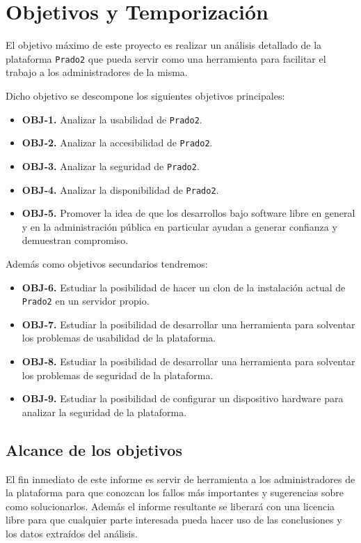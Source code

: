 \chapter{Objetivos y Temporización}


El objetivo máximo de este proyecto es realizar un análisis detallado de la plataforma \texttt{Prado2} que pueda servir como una herramienta para facilitar el trabajo a los administradores de la misma.

\bigskip
Dicho objetivo se descompone los siguientes objetivos principales:

\begin{itemize}
  \item \textbf{OBJ-1.} Analizar la usabilidad de \texttt{Prado2}.
  \item \textbf{OBJ-2.} Analizar la accesibilidad de \texttt{Prado2}.
  \item \textbf{OBJ-3.} Analizar la seguridad de \texttt{Prado2}.
  \item \textbf{OBJ-4.} Analizar la disponibilidad de \texttt{Prado2}.
  \item \textbf{OBJ-5.} Promover la idea de que los desarrollos bajo software libre en general y en la administración pública en particular ayudan a generar confianza y demuestran compromiso.

\end{itemize}

Además como objetivos secundarios tendremos:

\begin{itemize}
  \item \textbf{OBJ-6.} Estudiar la posibilidad de hacer un clon de la instalación actual de \texttt{Prado2} en un servidor propio.
  \item \textbf{OBJ-7.} Estudiar la posibilidad de desarrollar una herramienta para solventar los problemas de usabilidad de la plataforma.
  \item \textbf{OBJ-8.} Estudiar la posibilidad de desarrollar una herramienta para solventar los problemas de seguridad de la plataforma.
   \item \textbf{OBJ-9.} Estudiar la posibilidad de configurar un dispositivo hardware para analizar la seguridad de la plataforma.
\end{itemize}



\section{Alcance de los objetivos}
El fin inmediato de este informe es servir de herramienta a los administradores de la plataforma para que conozcan los fallos más importantes y sugerencias sobre como solucionarlos.
Además el informe resultante se liberará con una licencia libre para que cualquier parte interesada pueda hacer uso de las conclusiones y los datos extraídos del análisis.

